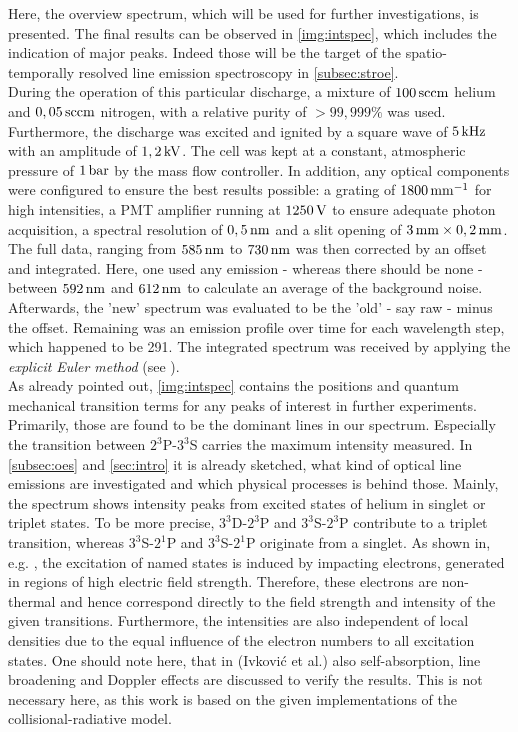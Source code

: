 \documentclass[a4paper,10pt,twoside]{article}
\newcommand{\tilt}[1]{\textit{#1}}
\begin{document}
			Here, the overview spectrum, which will be used for further investigations, is presented. The final results can be observed in \autoref{img:intspec}, which includes the indication of major peaks. Indeed those will be the target of the spatio-temporally resolved line emission spectroscopy in \autoref{subsec:stroe}.\\
			During the operation of this particular discharge, a mixture of $\unit[100]{sccm}$ helium and $\unit[0,05]{sccm}$ nitrogen, with a relative purity of $>99,999\%$ was used. Furthermore, the discharge was excited and ignited by a square wave of $\unit[5]{kHz}$ with an amplitude of $\unit[1,2]{kV}$. The cell was kept at a constant, atmospheric pressure of $\unit[1]{bar}$ by the mass flow controller. In addition, any optical components were configured to ensure the best results possible: a grating of $\unit[1800]{mm^{-1}}$ for high intensities, a PMT amplifier running at $\unit[1250]{V}$ to ensure adequate photon acquisition, a spectral resolution of $\unit[0,5]{nm}$ and a slit opening of $\unit[3]{mm}\times\unit[0,2]{mm}$.\\
			The full data, ranging from $\unit[585]{nm}$ to $\unit[730]{nm}$ was then corrected by an offset and integrated. Here, one used any emission - whereas there should be none - between $\unit[592]{nm}$ and $\unit[612]{nm}$ to calculate an average of the background noise. Afterwards, the 'new' spectrum was evaluated to be the 'old' - say raw - minus the offset. Remaining was an emission profile over time for each wavelength step, which happened to be 291. The integrated spectrum was received by applying the \tilt{explicit Euler method} (see \cite{Wiki:Euler}).\\
			As already pointed out, \autoref{img:intspec} contains the positions and quantum mechanical transition terms for any peaks of interest in further experiments. Primarily, those are found to be the dominant lines in our spectrum. Especially the transition between $2^3$P-$3^3$S carries the maximum intensity measured. In \autoref{subsec:oes} and \autoref{sec:intro} it is already sketched, what kind of optical line emissions are investigated and which physical processes is behind those. Mainly, the spectrum shows intensity peaks from excited states of helium in singlet or triplet states. To be more precise, $3^3$D-$2^3$P and $3^3$S-$2^3$P contribute to a triplet transition, whereas $3^3$S-$2^1$P and $3^3$S-$2^1$P originate from a singlet. As shown in, e.g. \cite{linratio1_14}, the excitation of named states is induced by impacting electrons, generated in regions of high electric field strength. Therefore, these electrons are non-thermal and hence correspond directly to the field strength and intensity of the given transitions. Furthermore, the intensities are also independent of local densities due to the equal influence of the electron numbers to all excitation states. One should note here, that in \cite{linratio1_14} (Ivkovi{\'c} et al.) also self-absorption, line broadening and Doppler effects are discussed to verify the results. This is not necessary here, as this work is based on the given implementations of the collisional-radiative model.
			
\end{document}

